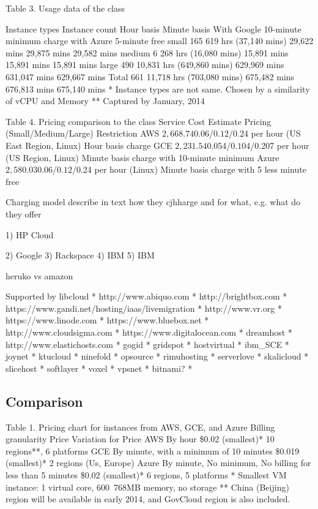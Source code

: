 \documentclass{sig-alternate}
\begin{document}
Table 3. Usage data of the class

Instance types	Instance count	Hour basis	Minute basis	With Google 10-minute minimum charge	with Azure 5-minute free
small	165	619 hrs (37,140 mins)	29,622 mins	29,875 mins	29,582 mins
medium	6	268 hrs (16,080 mins)	15,891 mins	15,891 mins	15,891 mins
large	490	10,831 hrs (649,860 mins)	629,969 mins	631,047 mins	629,667 mins
Total	661	11,718 hrs (703,080 mins)	675,482 mins	676,813 mins	675,140 mins
* Instance types are not same. Chosen by a similarity of vCPU and Memory
** Captured by January, 2014

Table 4. Pricing comparison to the class
Service	Cost Estimate	Pricing (Small/Medium/Large)	Restriction
AWS	$2,668.74	$0.06/$0.12/$0.24 per hour (US East Region, Linux)	Hour basis charge
GCE	$2,231.54	$0.054/$0.104/$0.207 per hour (US Region, Linux)	Minute basis charge with 10-minute minimum
Azure	$2,580.03	$0.06/$0.12/$0.24 per hour (Linux)	Minute basis charge with 5 less minute free

Charging model describe in text how they cjhharge and for what, e.g. what do they offer

1)	HP Cloud

2)	Google
3)	Rackspace
4)	IBM
5)	IBM

heruko vs amazon


Supported by libcloud
*	http://www.abiquo.com
*	http://brightbox.com
*	https://www.gandi.net/hosting/iaas/livemigration
*	http://www.vr.org
*	https://www.linode.com
*	https://www.bluebox.net
*	http://www.cloudsigma.com
*	https://www.digitalocean.com
*	dreamhost
*	http://www.elastichosts.com
*	gogid
*	gridspot
*	hostvirtual
*	ibm\_SCE
*	joynet
*	ktucloud
*	ninefold
*	opsource
*	rimuhosting
*	serverlove
*	skalicloud
*	slicehost
*	softlayer
*	voxel
*	vpsnet
*	bitnami?
*	
\subsection{Comparison}

Table 1. Pricing chart for instances from AWS, GCE, and Azure
	Billing granularity	Price	Variation for Price
AWS	By hour	\$0.02 (smallest)*	10 regions**, 6 platforms
GCE	By minute, with a minimum of 10 minutes	\$0.019 (smallest)*	2 regions (Us, Europe)
Azure	By minute, No minimum, No billing for less than 5 minutes	\$0.02 (smallest)*	6 regions, 5 platforms
* Smallest VM instance: 1 virtual core, 600~768MB memory, no storage
** China (Beijing) region will be available in early 2014, and GovCloud region is also included.
\end{document}
